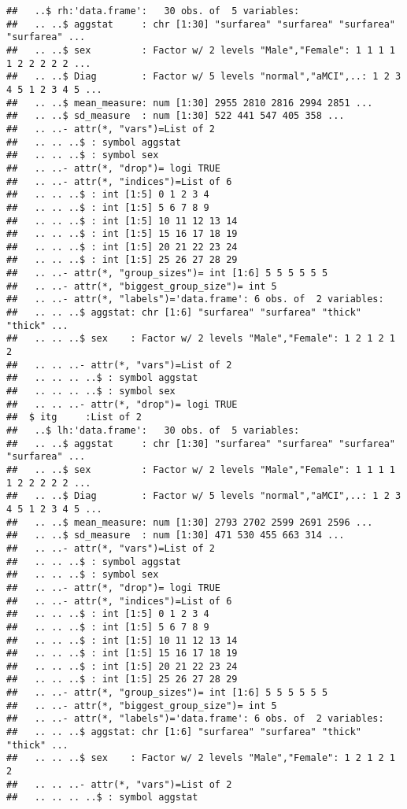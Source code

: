 \documentclass[12pt]{article}\usepackage[]{graphicx}\usepackage[]{color}
\makeatletter
\newenvironment{kframe}{%
 \def\at@end@of@kframe{}%
 \ifinner\ifhmode%
  \def\at@end@of@kframe{\end{minipage}}%
  \begin{minipage}{\columnwidth}%
 \fi\fi%
 \def\FrameCommand##1{\hskip\@totalleftmargin \hskip-\fboxsep
 \colorbox{shadecolor}{##1}\hskip-\fboxsep
     \hskip-\linewidth \hskip-\@totalleftmargin \hskip\columnwidth}%
 \MakeFramed {\advance\hsize-\width
   \@totalleftmargin\z@ \linewidth\hsize
   \@setminipage}}%
 {\par\unskip\endMakeFramed%
 \at@end@of@kframe}
\newenvironment{knitrout}{}{} %
\makeatother
\begin{document}
\begin{knitrout}
\begin{kframe}
\begin{verbatim}
##   ..$ rh:'data.frame':	30 obs. of  5 variables:
##   .. ..$ aggstat     : chr [1:30] "surfarea" "surfarea" "surfarea" "surfarea" ...
##   .. ..$ sex         : Factor w/ 2 levels "Male","Female": 1 1 1 1 1 2 2 2 2 2 ...
##   .. ..$ Diag        : Factor w/ 5 levels "normal","aMCI",..: 1 2 3 4 5 1 2 3 4 5 ...
##   .. ..$ mean_measure: num [1:30] 2955 2810 2816 2994 2851 ...
##   .. ..$ sd_measure  : num [1:30] 522 441 547 405 358 ...
##   .. ..- attr(*, "vars")=List of 2
##   .. .. ..$ : symbol aggstat
##   .. .. ..$ : symbol sex
##   .. ..- attr(*, "drop")= logi TRUE
##   .. ..- attr(*, "indices")=List of 6
##   .. .. ..$ : int [1:5] 0 1 2 3 4
##   .. .. ..$ : int [1:5] 5 6 7 8 9
##   .. .. ..$ : int [1:5] 10 11 12 13 14
##   .. .. ..$ : int [1:5] 15 16 17 18 19
##   .. .. ..$ : int [1:5] 20 21 22 23 24
##   .. .. ..$ : int [1:5] 25 26 27 28 29
##   .. ..- attr(*, "group_sizes")= int [1:6] 5 5 5 5 5 5
##   .. ..- attr(*, "biggest_group_size")= int 5
##   .. ..- attr(*, "labels")='data.frame':	6 obs. of  2 variables:
##   .. .. ..$ aggstat: chr [1:6] "surfarea" "surfarea" "thick" "thick" ...
##   .. .. ..$ sex    : Factor w/ 2 levels "Male","Female": 1 2 1 2 1 2
##   .. .. ..- attr(*, "vars")=List of 2
##   .. .. .. ..$ : symbol aggstat
##   .. .. .. ..$ : symbol sex
##   .. .. ..- attr(*, "drop")= logi TRUE
##  $ itg     :List of 2
##   ..$ lh:'data.frame':	30 obs. of  5 variables:
##   .. ..$ aggstat     : chr [1:30] "surfarea" "surfarea" "surfarea" "surfarea" ...
##   .. ..$ sex         : Factor w/ 2 levels "Male","Female": 1 1 1 1 1 2 2 2 2 2 ...
##   .. ..$ Diag        : Factor w/ 5 levels "normal","aMCI",..: 1 2 3 4 5 1 2 3 4 5 ...
##   .. ..$ mean_measure: num [1:30] 2793 2702 2599 2691 2596 ...
##   .. ..$ sd_measure  : num [1:30] 471 530 455 663 314 ...
##   .. ..- attr(*, "vars")=List of 2
##   .. .. ..$ : symbol aggstat
##   .. .. ..$ : symbol sex
##   .. ..- attr(*, "drop")= logi TRUE
##   .. ..- attr(*, "indices")=List of 6
##   .. .. ..$ : int [1:5] 0 1 2 3 4
##   .. .. ..$ : int [1:5] 5 6 7 8 9
##   .. .. ..$ : int [1:5] 10 11 12 13 14
##   .. .. ..$ : int [1:5] 15 16 17 18 19
##   .. .. ..$ : int [1:5] 20 21 22 23 24
##   .. .. ..$ : int [1:5] 25 26 27 28 29
##   .. ..- attr(*, "group_sizes")= int [1:6] 5 5 5 5 5 5
##   .. ..- attr(*, "biggest_group_size")= int 5
##   .. ..- attr(*, "labels")='data.frame':	6 obs. of  2 variables:
##   .. .. ..$ aggstat: chr [1:6] "surfarea" "surfarea" "thick" "thick" ...
##   .. .. ..$ sex    : Factor w/ 2 levels "Male","Female": 1 2 1 2 1 2
##   .. .. ..- attr(*, "vars")=List of 2
##   .. .. .. ..$ : symbol aggstat

\end{verbatim}
\end{kframe}
\end{knitrout}
\end{document}
